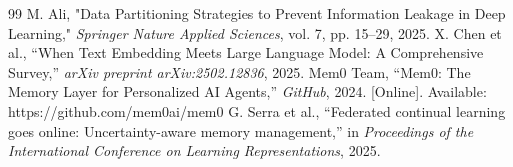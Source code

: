 \documentclass[conference]{IEEEtran}
\begin{document}
\begin{thebibliography}{99}
 M. Ali, "Data Partitioning Strategies to Prevent Information Leakage in Deep Learning," \textit{Springer Nature Applied Sciences}, vol. 7, pp. 15–29, 2025.
 X. Chen et al., ``When Text Embedding Meets Large Language Model: A Comprehensive Survey,'' \textit{arXiv preprint arXiv:2502.12836}, 2025.
 Mem0 Team, ``Mem0: The Memory Layer for Personalized AI Agents,'' \textit{GitHub}, 2024. [Online]. Available: https://github.com/mem0ai/mem0
 G. Serra et al., ``Federated continual learning goes online: Uncertainty-aware memory management,'' in \textit{Proceedings of the International Conference on Learning Representations}, 2025.
\end{thebibliography}
\end{document}
